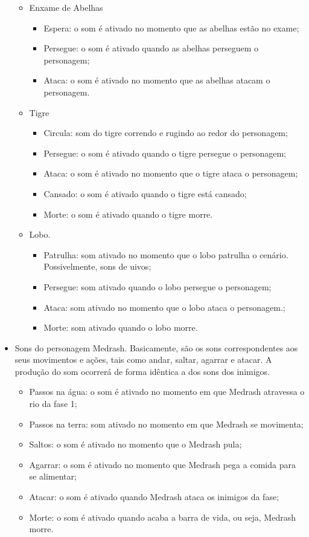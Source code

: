 \begin{itemize}
\begin{itemize}
\item Enxame de Abelhas
\begin{itemize}
\item Espera: o som é ativado no momento que as abelhas estão 
no exame;
\item Persegue: o som é ativado quando as abelhas perseguem o personagem;
\item Ataca: o som é ativado no momento que as abelhas atacam o personagem.
\end{itemize}

\item Tigre
\begin{itemize}
\item Circula: som do tigre correndo e rugindo ao redor do personagem;
\item Persegue: o som é ativado quando o tigre persegue o personagem;
\item Ataca: o som é ativado no momento que o tigre ataca o personagem;
\item Cansado: o som é ativado quando o tigre está cansado;
\item Morte: o som é ativado quando o tigre morre.
\end{itemize}

\item Lobo.
\begin{itemize}
\item Patrulha: som ativado no momento que o lobo patrulha o cenário. Possivelmente, sons de uivos;
\item Persegue: som ativado quando o lobo persegue o personagem;
\item Ataca: som ativado no momento que o lobo ataca o personagem.;
\item Morte: som ativado quando o lobo morre.
\end{itemize}

\end{itemize}

\item Sons do personagem Medrash. Basicamente, são os sons correspondentes
 aos seus movimentos e ações, tais como andar, saltar, agarrar e atacar. A
 produção do som ocorrerá de forma idêntica a dos sons dos inimigos.

\begin{itemize}
\item Passos na água: o som é ativado no momento em que Medrash 
atravessa o rio da fase 1;
\item Passos na terra: som ativado no momento em que Medrash se
 movimenta;
 \item Saltos: o som é ativado no momento que o Medrash pula;
\item Agarrar: o som é ativado no momento que Medrash pega a 
comida para se alimentar;
\item Atacar: o som é ativado quando Medrash ataca os inimigos
 da fase;
\item Morte: o som é ativado quando acaba a barra de vida, ou seja, 
Medrash morre.
\end{itemize}


\end{itemize}
